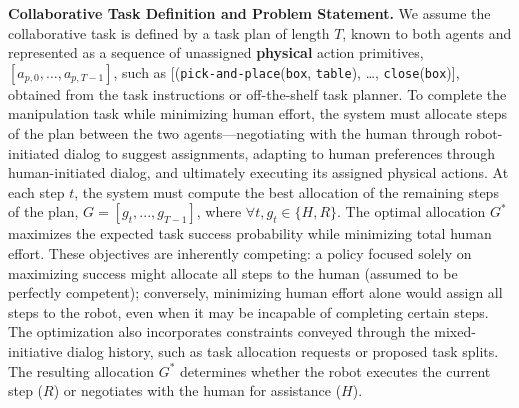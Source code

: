 \textbf{Collaborative Task Definition and Problem Statement.} 
We assume the collaborative task is defined by a task plan of length $T$, known to both agents and represented as a sequence of unassigned \textbf{physical} action primitives, $[a_{p,0}, ..., a_{p, T-1}]$, such as [(\texttt{pick-and-place}(\texttt{box}, \texttt{table}), \ldots, \texttt{close}(\texttt{box})], obtained from the task instructions or off-the-shelf task planner. 
To complete the manipulation task while minimizing human effort, the system must allocate steps of the plan between the two agents—negotiating with the human through robot-initiated dialog to suggest assignments, adapting to human preferences through human-initiated dialog, and ultimately executing its assigned physical actions.
At each step $t$, the system must compute the best allocation of the remaining steps of the plan, $G = [g_t, ..., g_{T-1}]$, where $\forall t, g_t \in \{H, R\}$. 
The optimal allocation $G^*$ maximizes the expected task success probability while minimizing total human effort.
These objectives are inherently competing: a policy focused solely on maximizing success might allocate all steps to the human (assumed to be perfectly competent); conversely, minimizing human effort alone would assign all steps to the robot, even when it may be incapable of completing certain steps.
The optimization also incorporates constraints conveyed through the mixed-initiative dialog history, such as task allocation requests or proposed task splits. %
The resulting allocation $G^*$ determines whether the robot executes the current step ($R$) or negotiates with the human for assistance ($H$).

